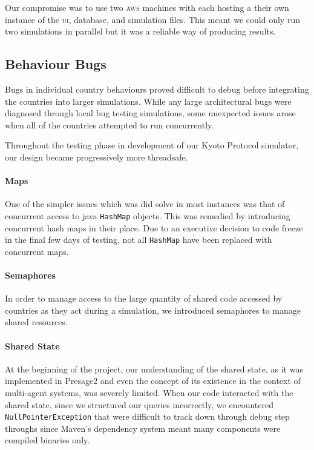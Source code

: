 Our compromise was to use two \textsc{aws} machines with each hosting a their own instance of the \textsc{ui}, database, and simulation files.  This meant we could only run two simulations in parallel but it was a reliable way of producing results.

\subsection{Behaviour Bugs}

Bugs in individual country behaviours proved difficult to debug before integrating the countries into larger simulations. While any large architectural bugs were diagnosed through local bug testing simulations, some unexpected issues arose when all of the countries attempted to run concurrently.

Throughout the testing phase in development of our Kyoto Protocol simulator, our design became progressively more threadsafe.

\paragraph{Maps} 
One of the simpler issues which was did solve in most instances was that of concurrent access to java \texttt{HashMap} objects. This was remedied by introducing concurrent hash maps in their place. Due to an executive decision to code freeze in the final few days of testing, not all \texttt{HashMap} have been replaced with concurrent maps.

\paragraph{Semaphores}
In order to manage access to the large quantity of shared code accessed by countries as they act during a simulation, we introduced semaphores to manage shared resources.

\paragraph{Shared State}
At the beginning of the project, our understanding of the shared state, as it was implemented in Presage2 and even the concept of its existence in the context of multi-agent systems, was severely limited. When our code interacted with the shared state, since we structured our queries incorrectly, we encountered \texttt{NullPointerException} that were difficult to track down through debug step throughs since Maven's dependency system meant many components were compiled binaries only.

